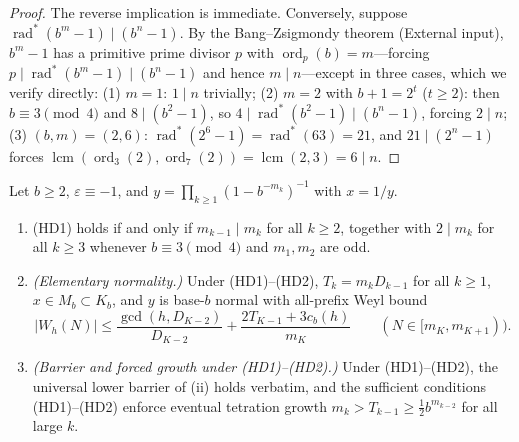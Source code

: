 \documentclass[11pt]{article}
\DeclareMathOperator{\ord}{ord}
\DeclareMathOperator{\lcm}{lcm}
\DeclareMathOperator{\rad}{rad}
\begin{document}
\begin{proof}
The reverse implication is immediate. Conversely, suppose $\rad^*(b^m-1)\mid(b^n-1)$. By the Bang--Zsigmondy theorem \cite{Bang1886,Zsigmondy1892} (External input), $b^m-1$ has a primitive prime divisor $p$ with $\ord_p(b)=m$---forcing $p\mid\rad^*(b^m-1)\mid(b^n-1)$ and hence $m\mid n$---except in three cases, which we verify directly: (1) $m=1$: $1\mid n$ trivially; (2) $m=2$ with $b+1=2^t$ ($t\ge2$): then $b\equiv3\pmod4$ and $8\mid(b^2-1)$, so $4\mid\rad^*(b^2-1)\mid(b^n-1)$, forcing $2\mid n$; (3) $(b,m)=(2,6)$: $\rad^*(2^6-1)=\rad^*(63)=21$, and $21\mid(2^n-1)$ forces $\lcm(\ord_3(2),\ord_7(2))=\lcm(2,3)=6\mid n$.
\end{proof}

\begin{theorem}\label{thm:HD-rigidity}
Let $b\ge2$, $\varepsilon\equiv-1$, and $y=\prod_{k\ge1}(1-b^{-m_k})^{-1}$ with $x=1/y$.
\begin{enumerate}[label=\textup{(\roman*)},nosep]
\item \textup{(HD1)} holds if and only if $m_{k-1}\mid m_k$ for all $k\ge2$, together with $2\mid m_k$ for all $k\ge3$ whenever $b\equiv3\pmod4$ and $m_1,m_2$ are odd.
\item \emph{(Elementary normality.)} Under \textup{(HD1)}--\textup{(HD2)}, $T_k=m_k D_{k-1}$ for all $k\ge1$, $x\in M_b\subset K_b$, and $y$ is base-$b$ normal with all-prefix Weyl bound
\[
|W_h(N)|\le\frac{\gcd(h,D_{K-2})}{D_{K-2}}+\frac{2T_{K-1}+3c_b(h)}{m_K}\qquad(N\in[m_K,m_{K+1})).
\]
\item \emph{(Barrier and forced growth under \textup{(HD1)}--\textup{(HD2)}.)} Under \textup{(HD1)}--\textup{(HD2)}, the universal lower barrier of (ii) holds verbatim, and the sufficient conditions \textup{(HD1)}--\textup{(HD2)} enforce eventual tetration growth $m_k>T_{k-1}\ge\frac12 b^{m_{k-2}}$ for all large $k$.
\end{enumerate}
\end{theorem}
\end{document}
